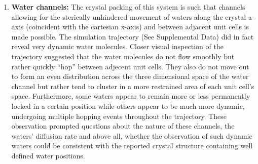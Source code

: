 \documentclass[12pt,letterpaper]{report}
\begin{document}
\begin{enumerate}
	\begin{figure}[H]
	\centering
	\setcounter{subfigure}{0}
	\caption{B-factors calculated using the ``reverse symmetry'' method with and without translational/rotational backbone alignment.}
	\label{bfactorsB}
	\end{figure}


	\begin{itemize}
	\item need to combine the two subfigures in figure \ref{bfactorsA} and \ref{bfactorsB} into one graph
	\item calculate correlation between simulation and experimental b-factors and make table or add to graph
	\item need to redo reverse symmetry method so that I am not reverse translating on the average unit cell structures but on the entire trajectory
	\end{itemize}

\subsection{Water dynamics in the crystal}
\item \textbf{Water channels:} The crystal packing of this system is such that channels allowing for the sterically unhindered movement of waters along the crystal a-axis (coincident with the cartesian x-axis) and between adjacent unit cells is made possible. The simulation trajectory (See Supplemental Data) did in fact reveal very dynamic water molecules. Closer visual inspection of the trajectory suggested that the water molecules do not flow smoothly but rather quickly ``hop'' between adjecent unit cells. They also do not move out to form an even distribution across the three dimensional space of the water channel but rather tend to cluster in a more restrained area of each unit cell's space. Furthermore, some waters appear to remain more or less permanently locked in a certain position while others appear to be much more dynamic, undergoing multiple hopping events throughout the trajectory. These observation prompted questions about the nature of these channels, the waters' diffusion rate and above all, whether the observation of such dynamic waters could be consistent with the reported crystal structure containing well defined water positions.


\end{enumerate}
\end{document}

